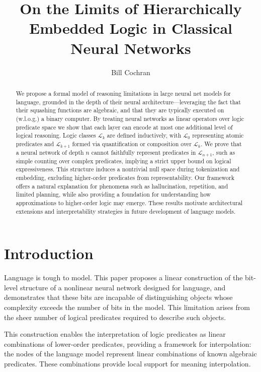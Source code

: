 \documentclass[12pt]{article}
\theoremstyle{plain}
\begin{document}
\title{On the Limits of Hierarchically Embedded Logic in Classical Neural Networks}
\author{Bill Cochran}
\maketitle

\begin{abstract}
We propose a formal model of reasoning limitations in large neural net models for language,
grounded in the depth of their neural architecture---leveraging the fact that their
squashing functions are algebraic, and that they are typically executed on (w.l.o.g.) a binary
computer. By treating neural networks as linear operators over logic predicate space we 
show that each layer can encode at most 
one additional level of logical reasoning. Logic classes $\mathcal{L}_k$ are 
defined inductively, with $\mathcal{L}_0$ representing atomic predicates and 
$\mathcal{L}_{k+1}$ formed via quantification or composition over $\mathcal{L}_k$. 
We prove that a neural network of depth $n$ cannot faithfully represent 
predicates in $\mathcal{L}_{n+1}$, such as simple counting over complex 
predicates, implying a strict upper bound on logical expressiveness. This structure 
induces a nontrivial null space during tokenization and embedding, excluding 
higher-order predicates from representability. Our framework offers a natural 
explanation for phenomena such as hallucination, repetition, and limited planning,
while also providing a foundation for understanding how 
approximations to higher-order logic may emerge. These results motivate architectural 
extensions and interpretability strategies in future development of language
models.
\end{abstract}


\section{Introduction}
Language is tough to model. This paper proposes a linear construction
of the bit-level structure of a nonlinear neural network designed for language,
and demonstrates that these bits are incapable of distinguishing objects
whose complexity exceeds the number of bits in the model. This limitation
arises from the sheer number of logical predicates required
to describe such objects.

This construction enables the interpretation of logic predicates
as linear combinations of lower-order predicates, providing
a framework for interpolation: the nodes of the language model
represent linear combinations of known algebraic predicates. These
combinations provide local support for meaning interpolation.
\end{document}
